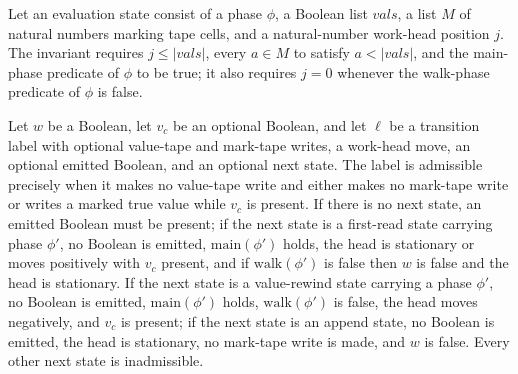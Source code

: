 \begin{definition}
\label{BoolCircuit.CircuitEval.Internal.Inv}
\leanok
{}
Let an evaluation state consist of a phase $\phi$, a Boolean list $vals$, a list $M$ of
natural numbers marking tape cells, and a natural-number work-head position $j$. The
invariant requires $j\le |vals|$, every $a\in M$ to satisfy $a<|vals|$, and the
main-phase predicate of $\phi$ to be true; it also requires $j=0$ whenever the
walk-phase predicate of $\phi$ is false.
\end{definition}

\begin{definition}
\label{BoolCircuit.CircuitEval.Internal.LAok}
\leanok
{}
Let $w$ be a Boolean, let $v_c$ be an optional Boolean, and let $\ell$ be a transition
label with optional value-tape and mark-tape writes, a work-head move, an optional
emitted Boolean, and an optional next state. The label is admissible precisely when it
makes no value-tape write and either makes no mark-tape write or writes a marked true
value while $v_c$ is present. If there is no next state, an emitted Boolean must be
present; if the next state is a first-read state carrying phase $\phi'$, no Boolean is
emitted, $\mathrm{main}(\phi')$ holds, the head is stationary or moves positively with
$v_c$ present, and if $\mathrm{walk}(\phi')$ is false then $w$ is false and the head is
stationary. If the next state is a value-rewind state carrying a phase $\phi'$, no
Boolean is emitted, $\mathrm{main}(\phi')$ holds, $\mathrm{walk}(\phi')$ is false, the
head moves negatively, and $v_c$ is present; if the next state is an append state, no
Boolean is emitted, the head is stationary, no mark-tape write is made, and $w$ is
false. Every other next state is inadmissible.
\end{definition}

